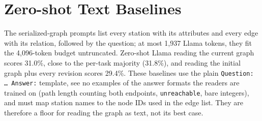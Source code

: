 \documentclass[11pt]{article}
\begin{document}
\section{Zero-shot Text Baselines}
\label{app:text}

The serialized-graph prompts list every station with its attributes and every edge with its relation, followed by the question; at most 1{,}937 Llama tokens, they fit the 4{,}096-token budget untruncated.
Zero-shot Llama reading the current graph scores 31.0\%, close to the per-task majority (31.8\%), and reading the initial graph plus every revision scores 29.4\%.
These baselines use the plain \texttt{Question: \ldots\ Answer:} template, see no examples of the answer formats the readers are trained on (path length counting both endpoints, \texttt{unreachable}, bare integers), and must map station names to the node IDs used in the edge list.
They are therefore a floor for reading the graph as text, not its best case.
\end{document}
